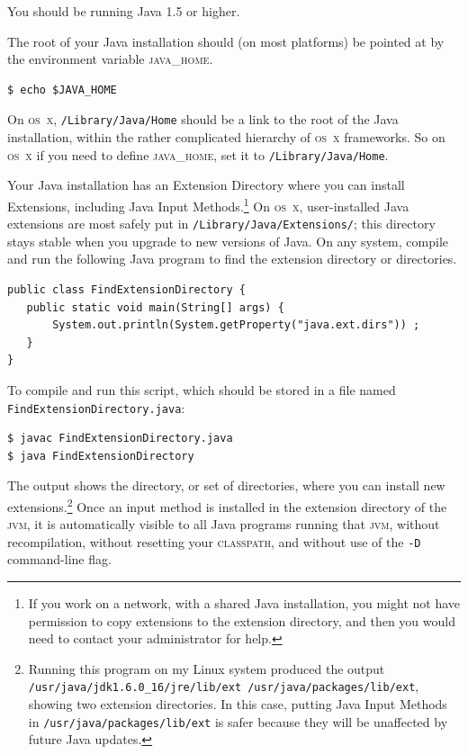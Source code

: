 \documentclass[letterpaper,12pt]{article}
\newcommand{\acro}{\textsc}
\begin{document}
\noindent
You should be running Java 1.5 or higher.

The root of your Java installation should (on most platforms) be pointed
at by the environment variable \acro{java\_home}.  

\begin{Verbatim}[fontsize=\small]
$ echo $JAVA_HOME
\end{Verbatim}

\noindent
On \acro{os~x}, \texttt{/Library/Java/Home} should be a link to the root
of the Java installation, within the rather complicated hierarchy of
\acro{os~x} frameworks.  So on \acro{os~x} if you need to define
\acro{java\_home}, set it to \texttt{/Library/Java/Home}.

Your Java installation has an Extension Directory where you can install
Extensions, including Java Input Methods.\footnote{If you work on a
network, with a shared Java installation, you might not have permission
to copy extensions to the extension directory, and then you would need to
contact your administrator for help.}  On \acro{os~x}, user-installed
Java extensions are most safely put in
\texttt{/Library/Java/Extensions/}; this directory stays stable when you
upgrade to new versions of Java.  On any system, compile and run the
following Java program to find the extension directory or
directories.

\begin{Verbatim}[fontsize=\small]
public class FindExtensionDirectory {
   public static void main(String[] args) {
       System.out.println(System.getProperty("java.ext.dirs")) ;
   }
}
\end{Verbatim}
 
\noindent
To compile and run this script, which should be stored in a file
named \texttt{FindExtensionDirectory.java}:

\begin{Verbatim}[fontsize=\small]
$ javac FindExtensionDirectory.java
$ java FindExtensionDirectory
\end{Verbatim}

\noindent
The output shows the directory, or set of directories, where you can
install new extensions.\footnote{Running this program on my Linux system
produced the output \texttt{/usr/java/jdk1.6.0\_16/jre/lib/ext
/usr/java/packages/lib/ext}, showing two extension directories.  In this
case, putting Java Input Methods in \texttt{/usr/java/packages/lib/ext}
is safer because they will be unaffected by future Java updates.} Once an
input method is installed in the extension directory of the \acro{jvm},
it is automatically visible to all Java programs running that \acro{jvm},
without recompilation, without resetting your \acro{classpath}, and
without use of the \verb!-D! command-line flag.  
\end{document}
